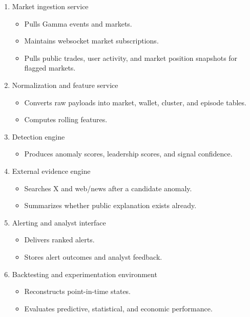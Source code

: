 \documentclass[
]{article}
\providecommand{\tightlist}{%
  \setlength{\itemsep}{0pt}\setlength{\parskip}{0pt}}
\begin{document}
\begin{enumerate}
\def\labelenumi{\arabic{enumi}.}
\item
  Market ingestion service

  \begin{itemize}
  \tightlist
  \item
    Pulls Gamma events and markets.
  \item
    Maintains websocket market subscriptions.
  \item
    Pulls public trades, user activity, and market position snapshots
    for flagged markets.
  \end{itemize}
\item
  Normalization and feature service

  \begin{itemize}
  \tightlist
  \item
    Converts raw payloads into market, wallet, cluster, and episode
    tables.
  \item
    Computes rolling features.
  \end{itemize}
\item
  Detection engine

  \begin{itemize}
  \tightlist
  \item
    Produces anomaly scores, leadership scores, and signal confidence.
  \end{itemize}
\item
  External evidence engine

  \begin{itemize}
  \tightlist
  \item
    Searches X and web/news after a candidate anomaly.
  \item
    Summarizes whether public explanation exists already.
  \end{itemize}
\item
  Alerting and analyst interface

  \begin{itemize}
  \tightlist
  \item
    Delivers ranked alerts.
  \item
    Stores alert outcomes and analyst feedback.
  \end{itemize}
\item
  Backtesting and experimentation environment

  \begin{itemize}
  \tightlist
  \item
    Reconstructs point-in-time states.
  \item
    Evaluates predictive, statistical, and economic performance.
  \end{itemize}
\end{enumerate}
\end{document}
